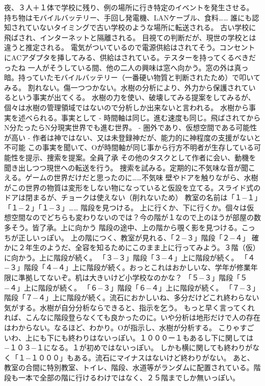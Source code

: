 \documentclass[uplatex]{utbook}
\begin{document}
夜、３人＋１体で学校に残り、例の場所に行き特定のイベントを発生させる。
持ち物はモバイルバッテリー、手回し発電機、LANケーブル、食料……
誰にも認知されていないタイミングで古い学校のような場所に転送される。
古い学校に飛ばされ、インターネットと隔離される。
目視ての判断だが、現世の学校とは違うと推定される。
電気がついているので電源供給はされてそう。コンセントにACアダプタを挿してみる、供給はされている。テスターを持ってくるべきだったね
一人がそうしている間、他の二人の興味は窓へ向かう。窓の外は真っ暗。持っていたモバイルバッテリー（一番硬い物質と判断されたため）で叩いてみる。
割れない。傷一つつかない。水樹の分析により、外力から保護されているという事実が出てくる。
水樹の力を使い、破壊してみる提案をしてみるが、個々は水樹の管理領域ではないので分析しか出来ないと言われる。
水樹から事実を述べられる。事実として
- 時間軸は同じ。進む速度も同じ。飛ばされてからN分たったらN分現実世界でも進む世界。
- 圏外であり、仮想空間である可能性が高い
- 作者は神ではない、又は未登録神だが、能力的に神程度の支援がないと不可能
この事実を聞いて、Oが時間軸が同じ事から行方不明者が生存している可能性を提示、捜索を提案。全員了承
その他のタスクとして作者に会い、動機を聞き出しつつ現世への転送を行う。
捜索を試みる。定期的に不気味な音が聞こえる。ゲームの世界だけだと思ったのに……不気味
壁やドアを触りながら、水樹がこの世界の物質は変形をしない物になっていると仮設を立てる。スライド式のドアは閉まるが、チョークは使えない（削れないため）
教室の名前は「１−１」「１−２」「１−３」……
階段を見つける。
上に行くか、下に行くか。個々は仮想空間なのでどちらも変わりないのでは？今の階が１なので上のほうが部屋の数多そう。皆了承。上に向かう
階段の途中、上の階から覗く影を見つける。こっちが正しいっぽい。
上の階につく、教室が見れる、「２−３」階段「２−４」
確かに２年生のようだ、全容を知るためにこのまま上に行ってみよう。３階（仮）に向かう。上に階段が続く。
「３−３」階段「３−４」上に階段が続く。
「４−３」階段「４−４」上に階段が続く。おっとこれはおかしいな、学年が修業年限に準拠してないぞ。机は大きいけど小学校なのかな？
「５−３」階段「５−４」上に階段が続く。
「６−３」階段「６−４」上に階段が続く。
「７−３」階段「７−４」上に階段が続く。流石におかしいね、多分だけどこれ終わらない気がする。水樹が自分分析ならできると、指示を乞う。
もっと早く言ってくれれば、こんなに階段登らなくても良かったのに。いや分析は地形だけで人の存在はわからない。なるほど、わかり。Oが指示し、水樹が分析する。
こりゃすごいわ、上にも下にも終わりはないっぽい。１０００ー１もあるし下に関しては−１０３−１になる。１が初めではないっぽい。
しかも横に関しても終わりがなく「１−１０００」もある。流石にマイナスはないけど終わりがない。
あと、教室の合間に特別教室、トイレ、階段、水道等がランダムに配置されている。階段も一本で全部の階に行けるわけではなく、２５階までしか無いっぽい。
\end{document}
